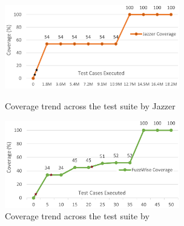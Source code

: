 
\begin{figure}[t]
    \centering
    \begin{minipage}{0.5\textwidth}
        \centering
        \includegraphics[width=3in]{RQ3_jazzer2.png}
        \vspace{-12pt}
        \caption{Coverage trend across the test suite by Jazzer}
        \label{fig:rq3-jazzer}
    \end{minipage}%
    \begin{minipage}{0.5\textwidth}
        \centering
        \includegraphics[width=3in]{RQ3_fuzzwise2.png}
        \vspace{-12pt}
        \caption{Coverage trend across the test suite by {\tool}}
        \label{fig:rq3-fuzzwise}
    \end{minipage}
\end{figure}


